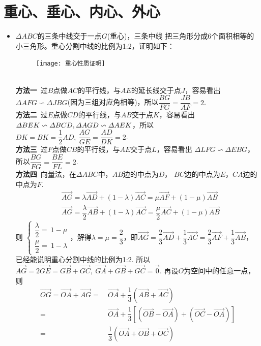 \section{重心、垂心、内心、外心}
\begin{itemize}[leftmargin=\inteval{\myitemleftmargin}pt,itemsep=
   \inteval{\myitemitempsep}pt,topsep=\inteval{\myitemtopsep}pt]
\item $ \Delta ABC $的三条中线交于一点$ G $(重心)，三条中线
把三角形分成6个面积相等的小三角形。重心分割中线的比例为1:2，证明如下：
\begin{figure}[h]
    \centering
    \texttt{[image: 重心性质证明]}
\end{figure} \\
\textbf{方法一}\ 过$ B $点做$ AC $的平行线，与$ AE $的延长线交于点$ J $，容易看出
$ \Delta AFG \backsim \Delta JBG $(因为三组对应角相等)，所以$ \dfrac{BG}{FG}=
\dfrac{JB}{AF}=2 $. \\
\textbf{方法二}\ 过$ E $点做$ CD $的平行线，与$ AB $交于点$ K $，容易看出
$ \Delta BEK \backsim \Delta BCD,\\ \Delta AGD \backsim \Delta AEK $，所以
$ DK=BK=\dfrac{1}{2}AD,\ \dfrac{AG}{GE}=\dfrac{AD}{DK}=2 $. \\
\textbf{方法三}\ 过$ F $点做$ CB $的平行线，与$ AE $交于点$ L $，容易看出
$ \Delta LFG \backsim \Delta EBG $，所以$\dfrac{BG}{FG}=\dfrac{BE}{FL}=2 $. \\
\textbf{方法四}\ 向量法，在$ \Delta ABC $中，$ AB $边的中点为$ D $，
$ BC $边的中点为$ E $，$ CA $边的中点为$ F $. 
\begin{align*}
    & \vec{AG}=\lambda \vec{AD}+(1-\lambda)\vec{AC}=
    \mu \vec{AF}+(1-\mu)\vec{AB} \\
    & \vec{AG}=\dfrac{\lambda}{2} \vec{AB}+(1-\lambda)\vec{AC}=
    \dfrac{\mu}{2} \vec{AC}+(1-\mu)\vec{AB} 
\end{align*}
则 $ \begin{cases}
    \dfrac{\lambda}{2} =\ 1-\mu  \\
    \dfrac{\mu}{2} =\ 1-\lambda
\end{cases} $，解得$ \lambda=\mu=\dfrac{2}{3} $，即$ \vec{AG}=
\dfrac{2}{3}\vec{AD}+\dfrac{1}{3}\vec{AC}=
\dfrac{2}{3}\vec{AF}+\dfrac{1}{3}\vec{AB} $，
已经能说明重心分割中线的比例为1:2. 所以$ \vec{AG}=
2\vec{GE}=\vec{GB}+\vec{GC}, 
\ \vec{GA}+\vec{GB}+\vec{GC}=
\vec{0} $. 再设$ O $为空间中的任意一点，则
\begin{align*}
    \vec{OG}=\vec{OA}+\vec{AG} =&\ 
    \vec{OA}+\dfrac{1}{3}\left(\vec{AB}+
    \vec{AC} \right) \\
    =&\ \vec{OA}+\dfrac{1}{3} \left[\left( \vec{OB} 
    -\vec{OA}\right) + \left( \vec{OC} -\vec{OA}\right)\right]  \\
    =&\ \dfrac{1}{3}\left(\vec{OA}+\vec{OB}+
    \vec{OC} \right) 
\end{align*}


\end{itemize}
